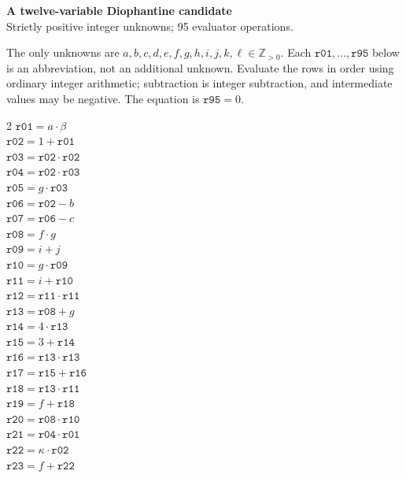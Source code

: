 \documentclass[10pt]{article}
\begin{document}
\begin{center}
{\large\bfseries A twelve-variable Diophantine candidate}\\
{\small Strictly positive integer unknowns; 95 evaluator operations.}
\end{center}
The only unknowns are \(a,b,c,d,e,f,g,h,i,j,k,\ell\in\mathbb Z_{>0}\).
Each \(\mathtt{r01},\ldots,\mathtt{r95}\) below is an abbreviation,
not an additional unknown. Evaluate the rows in order using ordinary integer
arithmetic; subtraction is integer subtraction, and intermediate values may be
negative. The equation is
\(\boxed{\mathtt{r95}=0}\).

\begin{multicols}{2}\small
\(\mathtt{r01} = a \cdot \beta\)\\
\(\mathtt{r02} = 1 + \mathtt{r01}\)\\
\(\mathtt{r03} = \mathtt{r02} \cdot \mathtt{r02}\)\\
\(\mathtt{r04} = \mathtt{r02} \cdot \mathtt{r03}\)\\
\(\mathtt{r05} = g \cdot \mathtt{r03}\)\\
\(\mathtt{r06} = \mathtt{r02} - b\)\\
\(\mathtt{r07} = \mathtt{r06} - c\)\\
\(\mathtt{r08} = f \cdot g\)\\
\(\mathtt{r09} = i + j\)\\
\(\mathtt{r10} = g \cdot \mathtt{r09}\)\\
\(\mathtt{r11} = i + \mathtt{r10}\)\\
\(\mathtt{r12} = \mathtt{r11} \cdot \mathtt{r11}\)\\
\(\mathtt{r13} = \mathtt{r08} + g\)\\
\(\mathtt{r14} = 4 \cdot \mathtt{r13}\)\\
\(\mathtt{r15} = 3 + \mathtt{r14}\)\\
\(\mathtt{r16} = \mathtt{r13} \cdot \mathtt{r13}\)\\
\(\mathtt{r17} = \mathtt{r15} + \mathtt{r16}\)\\
\(\mathtt{r18} = \mathtt{r13} \cdot \mathtt{r11}\)\\
\(\mathtt{r19} = f + \mathtt{r18}\)\\
\(\mathtt{r20} = \mathtt{r08} \cdot \mathtt{r10}\)\\
\(\mathtt{r21} = \mathtt{r04} \cdot \mathtt{r01}\)\\
\(\mathtt{r22} = \kappa \cdot \mathtt{r02}\)\\
\(\mathtt{r23} = f + \mathtt{r22}\)\\

\end{multicols}
\end{document}

